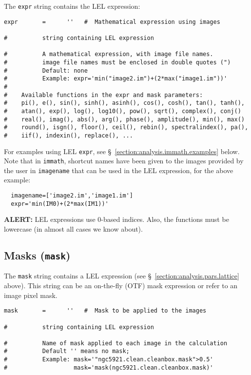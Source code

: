 The {\tt expr} string contains the LEL expression:
\small
\begin{verbatim}
expr       =      ''   #  Mathematical expression using images

#          string containing LEL expression

#          A mathematical expression, with image file names.
#          image file names must be enclosed in double quotes (")
#          Default: none 
#          Example: expr='min("image2.im")+(2*max("image1.im"))'
#
#    Available functions in the expr and mask parameters:
#    pi(), e(), sin(), sinh(), asinh(), cos(), cosh(), tan(), tanh(),
#    atan(), exp(), log(), log10(), pow(), sqrt(), complex(), conj()
#    real(), imag(), abs(), arg(), phase(), amplitude(), min(), max()
#    round(), isgn(), floor(), ceil(), rebin(), spectralindex(), pa(), 
#    iif(), indexin(), replace(), ...
\end{verbatim}
\normalsize

For examples using LEL {\tt expr}, see 
\S~\ref{section:analysis.immath.examples} below.  Note that in
{\tt immath}, shortcut names have been given to the images provided
by the user in {\tt imagename} that can be used in the LEL expression,
for the above example:
\small
\begin{verbatim}
  imagename=['image2.im','image1.im']
  expr='min(IM0)+(2*max(IM1))'
\end{verbatim}
\normalsize


{\bf ALERT:} LEL expressions use 0-based indices.
Also, the functions must be lowercase (in almost all cases we know
about).
    
\subsection{Masks ({\tt mask})}
\label{section:analysis.pars.mask}

The {\tt mask} string contains a LEL expression 
(see \S~\ref{section:analysis.pars.lattice} above).  This string
can be an on-the-fly (OTF) mask expression or refer to an 
image pixel mask.
\small
\begin{verbatim}
mask       =      ''   #  Mask to be applied to the images

#          string containing LEL expression

#          Name of mask applied to each image in the calculation
#          Default '' means no mask;  
#          Example: mask='"ngc5921.clean.cleanbox.mask">0.5'
#                   mask='mask(ngc5921.clean.cleanbox.mask)'
\end{verbatim}
\normalsize

